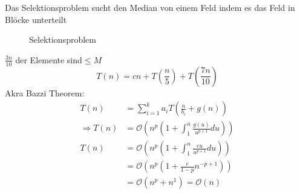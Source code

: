 Das Selektionsproblem sucht den Median von einem Feld indem es das Feld in Blöcke unterteilt
\begin{figure}[H]\center\caption{Selektionsproblem}\end{figure}
$\frac{3n}{10}$ der Elemente sind$\le M$\\
$$T(n)=cn+T\left(\frac{n}{5}\right)+T\left(\frac{7n}{10}\right)$$
Akra Bazzi Theorem:
\begin{align*}
T(n)&=\sum_{i=1}^ka_iT\left(\frac{n}{b_i}+g(n)\right)\\
\Rightarrow T(n)&= \mathcal O\left( n^p\left(1+\int_1^n\frac{g(u)}{u^{p+1}}du\right)\right)\\
T(n)&=\mathcal O\left(n^p\left(1+\int_1^n\frac{cu}{u^{p+1}}du\right)\right)\\
&=\mathcal O\left(n^p\left(1+\frac{c}{1-p}n^{-p+1}\right)\right)\\
&=\mathcal O(n^p+n^1)=\mathcal O(n)
\end{align*}
\\[.5em]